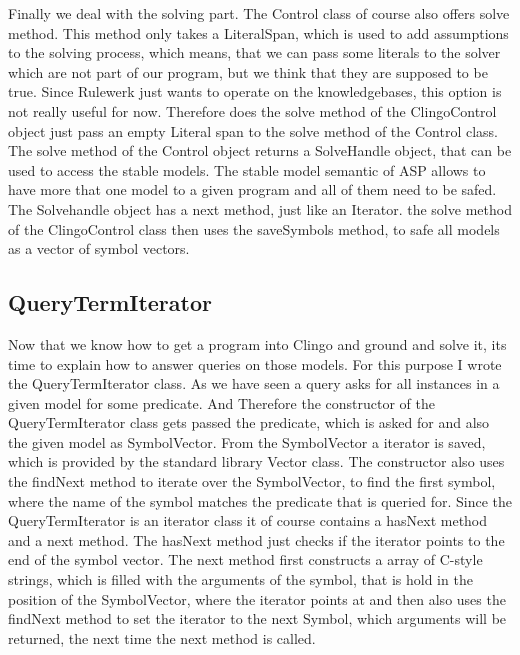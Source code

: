 \documentclass[hyperref, bachelorofscience]{cgvpub}
\begin{document}
Finally we deal with the solving part. The Control class of course also offers solve method. This method only takes a LiteralSpan, which is used to add assumptions to the solving process, which means, that we can pass some literals to the solver which are not part of our program, but we think that they are supposed to be true. 
Since Rulewerk just wants to operate on the knowledgebases, this option is not really useful for now. Therefore does the solve method of the ClingoControl object just pass an empty Literal span to the solve method of the Control class. The solve method of the Control object returns a SolveHandle object, that can be used to access the stable models. The stable model semantic of ASP allows to have more that one model to a given program and all of them need to be safed. The Solvehandle object has a next method, just like an Iterator. the solve method of the ClingoControl class then uses the saveSymbols method, to safe all models as a vector of symbol vectors. \\
\subsection{QueryTermIterator}
Now that we know how to get a program into Clingo and ground and solve it, its time to explain how to answer queries on those models. For this purpose I wrote the QueryTermIterator class. As we have seen a query asks for all instances in a given model for some predicate. And Therefore the constructor of the QueryTermIterator class gets passed the predicate, which is asked for and also the given model as SymbolVector. From the SymbolVector a iterator is saved, which is provided by the standard library Vector class. The constructor also uses the findNext method to iterate over the SymbolVector, to find the first symbol, where the name of the symbol matches the predicate that is queried for.  Since the QueryTermIterator is an iterator class it of course contains a hasNext method and a next method. The hasNext method just checks if the iterator points to the end of the symbol vector. The next method first constructs a array of C-style strings, which is filled with the arguments of the symbol, that is hold in the position of the SymbolVector, where the iterator points at and then also uses the findNext method to set the iterator to the next Symbol, which arguments will be returned, the next time the next method is called.  
\end{document}
